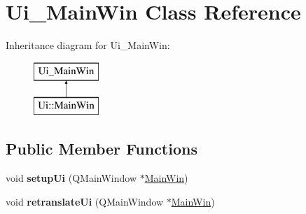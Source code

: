 \hypertarget{class_ui___main_win}{}\section{Ui\+\_\+\+Main\+Win Class Reference}
\label{class_ui___main_win}
Inheritance diagram for Ui\+\_\+\+Main\+Win\+:\begin{figure}[H]
\begin{center}
\leavevmode
\includegraphics[height=2.000000cm]{class_ui___main_win}
\end{center}
\end{figure}
\subsection*{Public Member Functions}
\begin{DoxyCompactItemize}
\item 
\mbox{\label{class_ui___main_win_a5d1d8e14b7878337a685fab66f26c28d}} 
void {\bfseries setup\+Ui} (Q\+Main\+Window $\ast$\mbox{\hyperlink{class_main_win}{Main\+Win}})
\item 
\mbox{\label{class_ui___main_win_a1bce8e2218d94fc5f3b2c90cf742886e}} 
void {\bfseries retranslate\+Ui} (Q\+Main\+Window $\ast$\mbox{\hyperlink{class_main_win}{Main\+Win}})
\end{DoxyCompactItemize}
